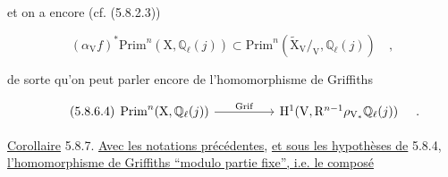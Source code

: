%
%
%
et on a encore (cf. (5.8.2.3))

\begin{equation}\tag{5.8.6.3}
(\alpha_{\mathrm{V}}f)^* \mathrm{Prim}^n(\mathrm{X},\mathbb{Q}_\ell(j)) \subset \mathrm{Prim}^n(\widetilde{\mathrm{X}}_{\mathrm{V}}/_{\mathrm{V}} , \mathbb{Q}_\ell(j)) \quad ,
\end{equation}

de sorte qu'on peut parler encore de l'homomorphisme de Griffiths

\begin{equation}\tag{5.8.6.4}
\begin{tikzcd}[column sep=huge]
\mathrm{Prim}^n(\mathrm{X},\mathbb{Q}_\ell(j)) \arrow[r, "\mathrm{Grif}"] & \mathrm{H}^1(\mathrm{V},\mathrm{R}^{n-1}\rho_{\mathrm{V}_*}\mathbb{Q}_\ell(j))
\end{tikzcd}
\quad .
\end{equation}

\underline{Corollaire} 5.8.7. \underline{Avec les notations précédentes}, \underline{et sous les hypothèses de} 5.8.4, \underline{l'homomorphisme de Griffiths ``modulo partie fixe'', i.e. le composé}

